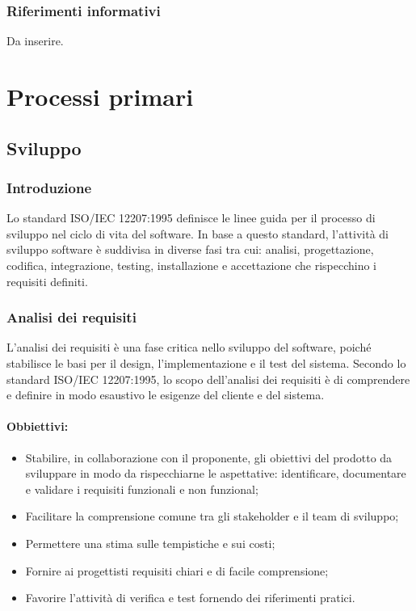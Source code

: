 \documentclass{article}
\begin{document}
\subsubsection{Riferimenti informativi}
Da inserire.

\section{Processi primari}
\subsection{Sviluppo}
\subsubsection{Introduzione}
Lo standard ISO/IEC 12207:1995 definisce le linee guida per il processo di sviluppo nel ciclo di vita del software. In base a questo standard, l'attività di sviluppo software è suddivisa in diverse fasi tra cui: analisi, progettazione, codifica, integrazione, testing,
installazione e accettazione che rispecchino i requisiti definiti.
\subsubsection{Analisi dei requisiti}
L'analisi dei requisiti è una fase critica nello sviluppo del software, poiché stabilisce le basi per il design, l'implementazione e il test del sistema. Secondo lo standard ISO/IEC 12207:1995, lo scopo dell'analisi dei requisiti è di comprendere e definire in modo esaustivo le esigenze del cliente e del sistema.
\paragraph{Obbiettivi:}
\begin{itemize}
    \item Stabilire, in collaborazione con il proponente, gli obiettivi del prodotto da sviluppare in modo da rispecchiarne le aspettative:  identificare, documentare e validare i requisiti funzionali e non funzional;
    \item Facilitare la comprensione comune tra gli stakeholder e il team di sviluppo;
    \item Permettere una stima sulle tempistiche e sui costi;
    \item Fornire ai progettisti requisiti chiari e di
    facile comprensione;
    \item Favorire l'attività di verifica e test fornendo dei riferimenti pratici.
\end{itemize}
\end{document}
